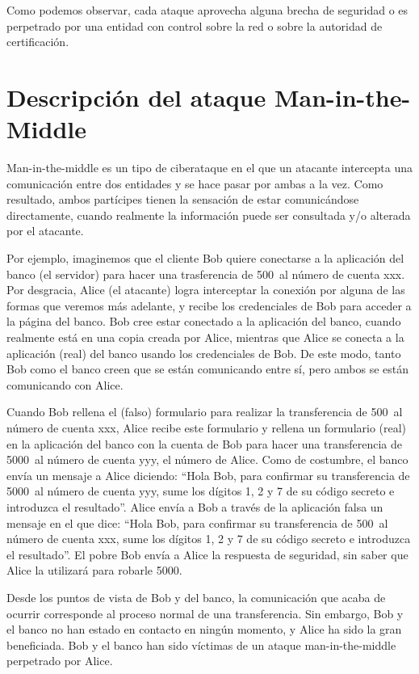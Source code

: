 \documentclass[11pt]{article}
\begin{document}
Como podemos observar, cada ataque aprovecha alguna brecha de seguridad o es perpetrado por una entidad con control sobre la red o sobre la autoridad
de certificación.

\section{Descripción del ataque Man-in-the-Middle}

Man-in-the-middle es un tipo de ciberataque en el que un atacante intercepta una comunicación entre dos entidades y se hace pasar por ambas a la vez.
Como resultado, ambos partícipes tienen la sensación de estar comunicándose directamente, cuando realmente la información puede ser
consultada y/o alterada por el atacante. 

Por ejemplo, imaginemos que el cliente Bob quiere conectarse a la aplicación del banco (el servidor) para hacer una trasferencia de 500\EUR \ al número de cuenta
xxx. Por desgracia, Alice (el atacante) logra interceptar la conexión por alguna de las formas que veremos más adelante, y recibe los credenciales de Bob para
acceder a la página del banco. Bob cree estar conectado a la aplicación del banco, cuando realmente está en una copia creada por Alice, mientras
que Alice se conecta a la aplicación (real) del banco usando los credenciales de Bob. De este modo, tanto Bob como el banco creen que se están
comunicando entre sí, pero ambos se están comunicando con Alice.

Cuando Bob rellena el (falso) formulario para realizar la transferencia de 500\EUR \ al número de cuenta xxx, Alice recibe este formulario y
rellena un formulario (real) en la aplicación del banco con la cuenta de Bob para hacer una transferencia de 5000\EUR \ al número de cuenta yyy,
el número de Alice. Como de costumbre, el banco envía un mensaje a Alice diciendo: ``Hola Bob, para confirmar su transferencia de 5000\EUR \ al número
 de cuenta yyy, sume los dígitos 1, 2 y 7 de su código secreto e introduzca el resultado''. Alice envía a Bob a través de la aplicación falsa
 un mensaje en el que dice:
 ``Hola Bob, para confirmar su transferencia de 500\EUR \ al número
 de cuenta xxx, sume los dígitos 1, 2 y 7 de su código secreto e introduzca el resultado''. El pobre Bob envía a Alice la respuesta de seguridad,
 sin saber que Alice la utilizará para robarle 5000\EUR. 
 
 Desde los puntos de vista de Bob y del banco, la comunicación que acaba de ocurrir corresponde al proceso normal de una transferencia. Sin embargo,
 Bob y el banco no han estado en contacto en ningún momento, y Alice ha sido la gran beneficiada. 
 Bob y el banco han sido víctimas de un ataque man-in-the-middle perpetrado por Alice.
 
\end{document}
